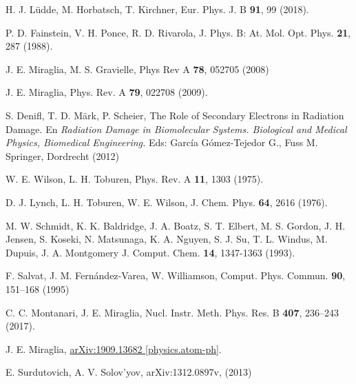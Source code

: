\begin{thebibliography}{9}
H. J. L\"udde, M. Horbatsch, T. Kirchner,
Eur. Phys. J. B \textbf{91}, 99 (2018).

P. D. Fainstein, V. H. Ponce, R. D. Rivarola,
J. Phys. B: At. Mol. Opt. Phys. \textbf{21}, 287 (1988).

J. E. Miraglia, M. S. Gravielle,
Phys Rev A \textbf{78}, 052705 (2008)

J. E. Miraglia, 
Phys. Rev. A \textbf{79}, 022708 (2009).

S. Denifl, T. D. Märk, P. Scheier,
The Role of Secondary Electrons in Radiation Damage. 
En \textit{Radiation Damage in Biomolecular Systems. Biological and Medical Physics, Biomedical Engineering.} 
Eds: García Gómez-Tejedor G., Fuss M. 
Springer, Dordrecht (2012) 

W. E. Wilson, L. H. Toburen,
Phys. Rev. A \textbf{11}, 1303 (1975).

D. J. Lynch, L. H. Toburen, W. E. Wilson,
J. Chem. Phys. \textbf{64}, 2616 (1976).

M. W. Schmidt, K. K. Baldridge, J. A. Boatz, S. T. Elbert, M. S. Gordon, 
J. H. Jensen, S. Koseki, N. Matsunaga, K. A. Nguyen, S. J. Su, T. L. Windus, 
M. Dupuis, J. A. Montgomery 
J. Comput. Chem. \textbf{14}, 1347-1363 (1993).

F. Salvat, J. M. Fern\'andez-Varea, W. Williamson,
Comput. Phys. Commun. \textbf{90}, 151--168 (1995)

C. C. Montanari, J. E. Miraglia,
Nucl. Instr. Meth. Phys. Res. B \textbf{407}, 236--243 (2017).

J. E. Miraglia,
\href{https://arxiv.org/abs/1909.13682}{arXiv:1909.13682 [physics.atom-ph]}.

E. Surdutovich, A. V. Solov'yov, 
arXiv:1312.0897v, (2013)


\end{thebibliography}
